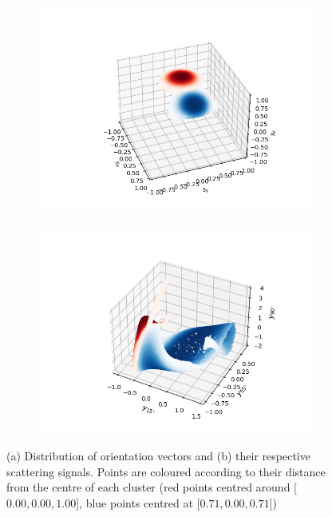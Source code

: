 \begin{figure}[h!]
	\centering
	\begin{subfigure}{0.4\textwidth}
		\subcaption{}
		\includegraphics[width=\textwidth]{fig3a.png}
	\end{subfigure}
	\begin{subfigure}{0.4\textwidth}
		\subcaption{}
		\includegraphics[width=\textwidth]{fig3b.png}
	\end{subfigure}
	\caption{(a) Distribution of orientation vectors and (b) their respective scattering signals. Points are coloured according to their distance from the centre of each cluster (red points centred around [$0.00, 0.00, 1.00$], blue points centred at [$0.71, 0.00, 0.71$])}
	\label{fig:mixing}
\end{figure}

